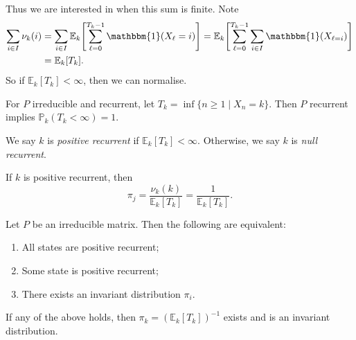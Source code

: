\documentclass[12pt]{article}
\begin{document}
Thus we are interested in when this sum is finite. Note
\begin{align*}
	\sum_{i \in I}\nu_k(i) &= \sum_{i \in I}\mathbb{E}_k\Biggl[\sum_{\ell = 0}^{T_k - 1}\mathbbm{1}(X_{\ell} = i) \Biggr] = \mathbb{E}_k\Biggl[\sum_{\ell = 0}^{T_k - 1}\sum_{i \in I} \mathbbm{1}(X_{\ell = i})\Biggr] \\
			       &= \mathbb{E}_k[T_k].
\end{align*}
So if $\mathbb{E}_k[T_k] < \infty$, then we can normalise.

\begin{definition}
	For $P$ irreducible and recurrent, let $T_k = \inf\{n \geq 1 \mid X_n = k\}$. Then $P$ recurrent implies $\mathbb{P}_k(T_k < \infty) = 1$.

	We say $k$ is \textit{positive recurrent} if $\mathbb{E}_k[T_k] < \infty$. Otherwise, we say $k$ is \textit{null recurrent}.
\end{definition}

If $k$ is positive recurrent, then
\[
	\pi_j = \frac{\nu_k(k)}{\mathbb{E}_k[T_k]} = \frac{1}{\mathbb{E}_k[T_k]}
.\]

\begin{theorem}
	Let $P$ be an irreducible matrix. Then the following are equivalent:
	\begin{enumerate}[\normalfont(i)]
		\item All states are positive recurrent;
		\item Some state is positive recurrent;
		\item There exists an invariant distribution $\pi_i$.
	\end{enumerate}
	If any of the above holds, then $\pi_k = (\mathbb{E}_k[T_k])^{-1}$ exists and is an invariant distribution.
\end{theorem}
\end{document}
